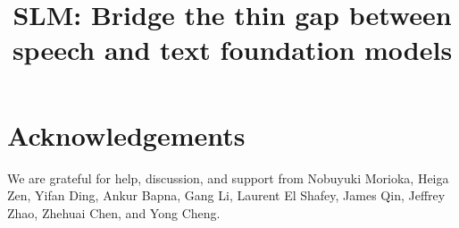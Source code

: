 \documentclass{article}
\title{SLM: Bridge the thin gap between speech and text foundation models}
\begin{document}
%
\maketitle
%








\section{Acknowledgements}
We are grateful for help, discussion, and support from Nobuyuki Morioka, Heiga Zen, Yifan Ding, Ankur Bapna, Gang Li, Laurent El Shafey, James Qin, Jeffrey Zhao, Zhehuai Chen, and Yong Cheng.




% 
\end{document}
